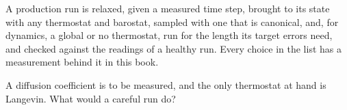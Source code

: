 \begin{keyidea}
A production run is relaxed, given a measured time step, brought to its
state with any thermostat and barostat, sampled with one that is
canonical, and, for dynamics, a global or no thermostat, run for the
length its target errors need, and checked against the readings of a
healthy run. Every choice in the list has a measurement behind it in this
book.
\end{keyidea}

\begin{selfcheck}
A diffusion coefficient is to be measured, and the only thermostat at
hand is Langevin. What would a careful run do?
\end{selfcheck}
